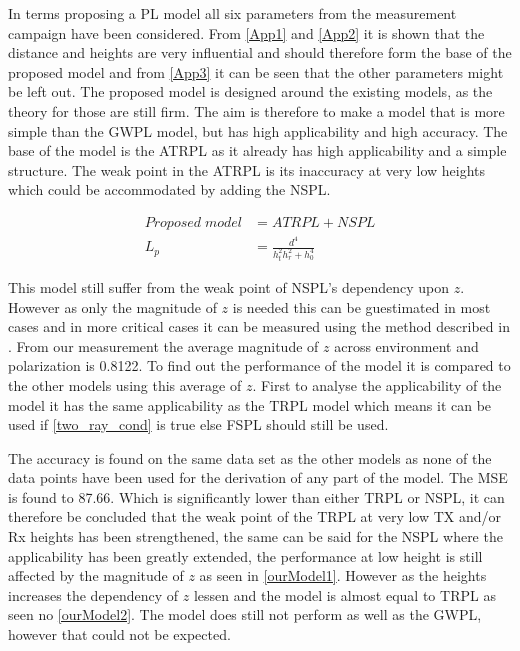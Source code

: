

In terms proposing a PL model all six parameters from the measurement campaign have been considered. From \autoref{App1} and \autoref{App2} it is shown that the distance and heights are very influential and should therefore form the base of the proposed model and from \autoref{App3} it can be seen that the other parameters might be left out. %
The proposed model is designed around the existing models, as the theory for those are still firm. The aim is therefore to make a model that is more simple than the GWPL model, but has high applicability and high accuracy. The base of the model is the ATRPL as it already has high applicability and a simple structure. The weak point in the ATRPL is its inaccuracy at very low heights which could be accommodated by adding the NSPL. 

\begin{align}
Proposed\; model &= ATRPL + NSPL \\
L_p &= \frac{d^4}{h_t^2 h_r^2+h_0^4}
\end{align}

This model still suffer from the weak point of NSPL's dependency upon $z$. However as only the magnitude of $z$ is needed this can be guestimated in most cases and in more critical cases it can be measured using the method described in \cite{Kim}. From our measurement the average magnitude of $z$ across environment and polarization is 0.8122. To find out the performance of the model it is compared to the other models using this average of $z$. First to analyse the applicability of the model it has the same applicability as the TRPL model which means it can be used if \eqref{two_ray_cond} is true else FSPL should still be used. 




The accuracy is found on the same data set as the other models as none of the data points have been used for the derivation of any part of the model. The MSE is found to 87.66. Which is significantly lower than either TRPL or NSPL, it can therefore be concluded that the weak point of the TRPL at very low TX and/or Rx heights has been strengthened, the same can be said for the NSPL where the applicability has been greatly extended, the performance at low height is still affected by the magnitude of $z$ as seen in \autoref{ourModel1}. However as the heights increases the dependency of $z$ lessen and the model is almost equal to TRPL as seen no \autoref{ourModel2}. The model does still not perform as well as the GWPL, however that could not be expected.

